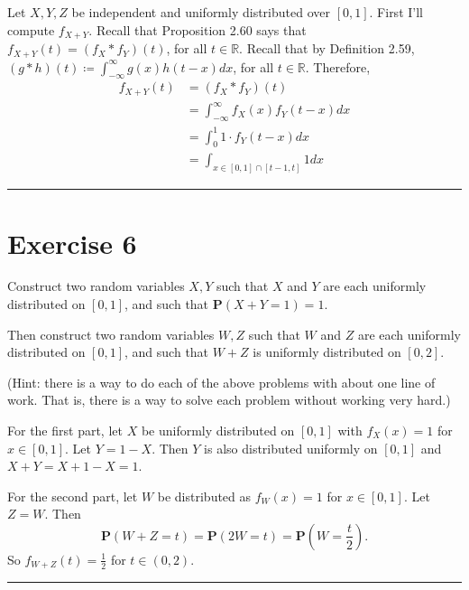 \documentclass{article}
\theoremstyle{break}
\newenvironment{solution}{{\bf Solution:}}{\hfill\rule{2mm}{2mm}}
\newcommand{\R}{\mathbb{R}}
\renewcommand{\P}{\mathbf{P}}
\begin{document}
\begin{solution}
Let $X,Y,Z$ be independent and uniformly distributed over $[0,1]$. First I'll compute $f_{X+Y}$. Recall that Proposition 2.60 says that $f_{X+Y}(t) = (f_X \ast f_Y)(t)$, for all $t \in \R$. Recall that by Definition 2.59, $(g \ast h)(t) \coloneqq \int_{-\infty}^\infty g(x) h(t-x) dx$, for all $t \in \R$. Therefore,
\begin{align*}
f_{X+Y}(t) &= (f_X \ast f_Y)(t) \\
	&= \int_{-\infty}^\infty f_X(x) f_Y(t-x) dx \\
	&= \int_0^1 1 \cdot f_Y(t-x) dx \\
	&= \int_{x \in [0,1]\cap[t-1,t]} 1 dx
\end{align*}





\end{solution}


\section*{Exercise 6}
Construct two random variables $X,Y$ such that $X$ and $Y$ are each uniformly distributed on $[0,1]$, and such that $\P(X+Y=1)=1$.

Then construct two random variables $W,Z$ such that $W$ and $Z$ are each uniformly distributed on $[0,1]$, and such that $W+Z$ is uniformly distributed on $[0,2]$.

(Hint: there is a way to do each of the above problems with about one line of work.  That is, there is a way to solve each problem without working very hard.)

\begin{solution}
For the first part, let $X$ be uniformly distributed on $[0,1]$ with $f_X(x) = 1$ for $x \in [0,1]$. Let $Y = 1 - X$. Then $Y$ is also distributed uniformly on $[0,1]$ and $X + Y = X + 1 - X = 1$. 

For the second part, let $W$ be distributed as $f_W(x) = 1$ for $x \in [0,1]$. Let $Z = W$. Then 
\[ \P(W + Z = t) = \P(2W = t) = \P\left(W = \frac{t}{2}\right).
\]
So $f_{W+Z}(t) = \frac{1}{2}$ for $t \in (0,2)$.
\begin{comment}
\begin{align*}
f_W(x) &= \P(W = x) \\
	&= \P(2W = 2x) \\
	&= \P(W + Z = 2x)
\end{align*}
\end{comment}
\end{solution}
\end{document}
